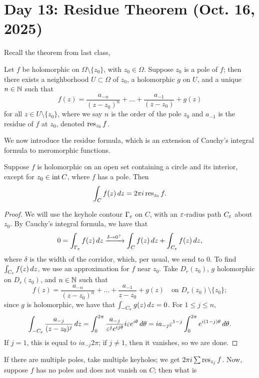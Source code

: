 \section{Day 13: Residue Theorem (Oct. 16, 2025)}
Recall the theorem from last class,
\begin{theorem}
    Let $f$ be holomorphic on $\Omega \setminus \{z_0\}$, with $z_0 \in \Omega$. Suppose $z_0$ is a pole of $f$; then there exists a neighborhood $U \subset \Omega$ of $z_0$, a holomorphic $g$ on $U$, and a unique $n \in \mathbb N$ such that
    \[ f(z) = \frac{a_{-n}}{(z - z_0)^n} + \dots + \frac{a_{-1}}{(z - z_0)} + g(z) \]
    for all $z \in U \setminus \{z_0\}$, where we say $n$ is the order of the pole $z_0$ and $a_{-1}$ is the residue of $f$ at $z_0$, denoted $\operatorname{res}_{z_0} f$.
\end{theorem}
\noindent We now introduce the residue formula, which is an extension of Cauchy's integral formula to meromorphic functions.
\begin{theorem}
    Suppose $f$ is holomorphic on an open set containing a circle and its interior, except for $z_0 \in \operatorname{int} C$, where $f$ has a pole. Then
    \[ \int_C f(z) \, dz = 2 \pi i \operatorname{res}_{z_0} f. \]
\end{theorem}
\begin{proof}
    We will use the keyhole contour $\Gamma_\varepsilon$ on $C$, with an $\varepsilon$-radius path $C_\varepsilon$ about $z_0$. By Cauchy's integral formula, we have that
    \[ 0 = \int_{\Gamma_\varepsilon} f(z) \, dz \xrightarrow{\delta \to 0^+} \int_C f(z) \, dz + \int_{C_\varepsilon} f(z) \, dz, \]
    where $\delta$ is the width of the corridor, which, per usual, we send to $0$. To find $\int_{C_\varepsilon} f(z) \, dz$, we use an approximation for $f$ near $z_0$. Take $D_r(z_0)$, $g$ holomorphic on $D_r(z_0)$, and $n \in \mathbb N$ such that
    \[ f(z) = \frac{a_{-n}}{(z - z_0)^n} + \dots + \frac{a_{-1}}{z - z_0} + g(z) \quad \text{on $D_r(z_0) \setminus \{z_0\}$}; \]
    since $g$ is holomorphic, we have that $\int_{-C_\varepsilon} g(z) \, dz = 0$. For $1 \leq j \leq n$,
    \[ \int_{-C_\varepsilon} \frac{a_{-j}}{(z - z_0)^j} \, dz = \int_0^{2\pi} \frac{a_{-j}}{\varepsilon^j e^{ij \theta}} i \varepsilon e^{i\theta} \, d\theta = i a_{-j} \varepsilon^{1-j} \int_{0}^{2\pi} e^{i(1-j)\theta} \, d\theta. \]
    If $j = 1$, this is equal to $i a_{-j} 2\pi$; if $j \neq 1$, then it vanishes, so we are done.
\end{proof}
\noindent If there are multiple poles, take multiple keyholes; we get $2\pi i \sum \operatorname{res}_{z_j} f$. Now, suppose $f$ has no poles and does not vanish on $C$; then what is

